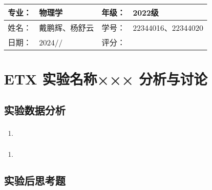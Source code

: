 \documentclass[dvipsnames, svgnames,a4paper,11pt]{article}
\begin{document}
	
	
	\clearpage
	
	\begin{table}
		\renewcommand\arraystretch{1.7}
		\begin{tabularx}{\textwidth}{|X|X|X|X|}
			\hline
			专业：& 物理学 &年级：& 2022级\\
			\hline
			姓名： & 戴鹏辉、杨舒云 & 学号：& 22344016、22344020\\
			\hline
			日期：& 2024// & 评分： &\\
			\hline
		\end{tabularx}
	\end{table}
	
	\section{ETX 实验名称××× \quad\heiti 分析与讨论}
	
	\subsection{实验数据分析}
	
	\subsubsection{}
	\begin{enumerate}
		\item 
	\end{enumerate}
	
	\subsubsection{}
	\begin{enumerate}
		\item 
	\end{enumerate}
	
	\subsubsection{}
	
	
	\subsection{实验后思考题}
	
	\begin{question}
		
	\end{question}
	
\end{document}
